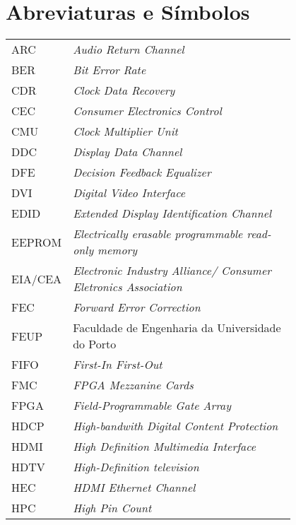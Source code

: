 \chapter*{Abreviaturas e Símbolos}

\begin{flushleft}
\begin{tabular}{l p{0.8\linewidth}}
ARC			& 	\textit{Audio Return Channel} 																			\\
BER			&	\textit{Bit Error Rate}																					\\
CDR			&	\textit{Clock Data Recovery}																			\\
CEC			& 	\textit{Consumer Electronics Control}																	\\
CMU			& 	\textit{Clock Multiplier Unit}																			\\
DDC			&	\textit{Display Data Channel}																			\\
DFE			&	\textit{Decision Feedback Equalizer}																	\\
DVI			&	\textit{Digital Video Interface}																		\\
EDID		&	\textit{Extended Display Identification Channel}														\\
EEPROM		&	\textit{Electrically erasable programmable read-only memory}											\\
EIA/CEA 	&	\textit{Electronic Industry Alliance/ Consumer Eletronics Association}									\\
FEC			&	\textit{Forward Error Correction}																		\\
FEUP      	& 	Faculdade de Engenharia da Universidade do Porto 														\\
FIFO		&	\textit{First-In First-Out}																				\\
FMC			&	\textit{FPGA Mezzanine Cards}																			\\
FPGA		&	\textit{Field-Programmable Gate Array}																	\\
HDCP		&	\textit{High-bandwith Digital Content Protection}														\\
HDMI		&	\textit{High Definition Multimedia Interface}															\\
HDTV		&	\textit{High-Definition television}																		\\
HEC 		&	\textit{HDMI Ethernet Channel}																			\\
HPC			&	\textit{High Pin Count}																					\\

\end{tabular}
\end{flushleft}
